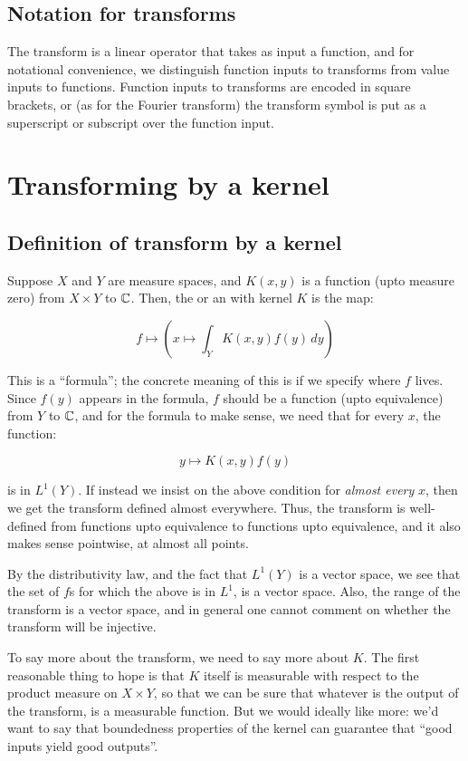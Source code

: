 \documentclass[a4paper]{amsart}
\begin{document}
\subsection{Notation for transforms}

The transform is a linear operator that takes as input a function, and
for notational convenience, we distinguish function inputs to
transforms from value inputs to functions. Function inputs to
transforms are encoded in square brackets, or (as for the Fourier
transform) the transform symbol is put as a superscript or subscript
over the function input.

\section{Transforming by a kernel}

\subsection{Definition of transform by a kernel}

Suppose $X$ and $Y$ are measure spaces, and $K(x,y)$ is a function (upto
measure zero) from $X \times Y$ to $\mathbb{C}$. Then, the  or an  with kernel $K$ is the map:

$$f \mapsto \left( x \mapsto \int_Y K(x,y)f(y) \, dy\right)$$

This is a ``formula''; the concrete meaning of this is if we specify
where $f$ lives. Since $f(y)$ appears in the formula, $f$ should be a
function (upto equivalence) from $Y$ to $\mathbb{C}$, and for the formula to
make sense, we need that for every $x$, the function:

$$y \mapsto K(x,y)f(y)$$

is in $L^1(Y)$.  If instead we insist on the above condition for {\em
  almost every} $x$, then we get the transform defined almost
everywhere. Thus, the transform is well-defined from functions upto
equivalence to functions upto equivalence, and it also makes sense
pointwise, at almost all points.

By the distributivity law, and the fact that $L^1(Y)$
is a vector space, we see that the set of $f$s for which the above is
in $L^1$, is a vector space. Also, the range of the transform is a
vector space, and in general one cannot comment on whether the
transform will be injective.

To say more about the transform, we need to say more about $K$. The
first reasonable thing to hope is that $K$ itself is measurable with
respect to the product measure on $X \times Y$, so that we can be sure
that whatever is the output of the transform, is a measurable
function. But we would ideally like more: we'd want to say that
boundedness properties of the kernel can guarantee that ``good inputs
yield good outputs''.
\end{document}
